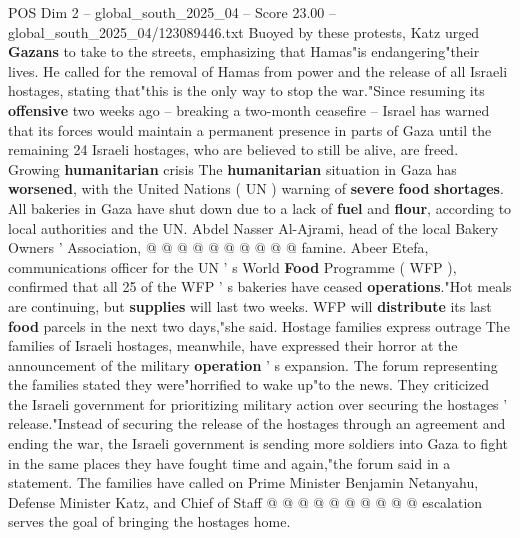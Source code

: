\begin{textsample}{POS Dim 2 – global\_south\_2025\_04 – Score 23.00 – global\_south\_2025\_04/123089446.txt}
Buoyed by these protests, Katz urged \textbf{Gazans} to take to the streets, emphasizing that Hamas"is endangering"their lives.
He called for the removal of Hamas from power and the release of all Israeli hostages, stating that"this is the only way to stop the war."Since resuming its \textbf{offensive} two weeks ago -- breaking a two-month ceasefire -- Israel has warned that its forces would maintain a permanent presence in parts of Gaza until the remaining 24 Israeli hostages, who are believed to still be alive, are freed.
Growing \textbf{humanitarian} crisis The \textbf{humanitarian} situation in Gaza has \textbf{worsened}, with the United Nations ( UN ) warning of \textbf{severe} \textbf{food} \textbf{shortages}.
All bakeries in Gaza have shut down due to a lack of \textbf{fuel} and \textbf{flour}, according to local authorities and the UN.
Abdel Nasser Al-Ajrami, head of the local Bakery Owners ' Association, @ @ @ @ @ @ @ @ @ @ famine.
Abeer Etefa, communications officer for the UN ' s World \textbf{Food} Programme ( WFP ), confirmed that all 25 of the WFP ' s bakeries have ceased \textbf{operations}."Hot meals are continuing, but \textbf{supplies} will last two weeks.
WFP will \textbf{distribute} its last \textbf{food} parcels in the next two days,"she said.
Hostage families express outrage The families of Israeli hostages, meanwhile, have expressed their horror at the announcement of the military \textbf{operation} ' s expansion.
The forum representing the families stated they were"horrified to wake up"to the news.
They criticized the Israeli government for prioritizing military action over securing the hostages ' release."Instead of securing the release of the hostages through an agreement and ending the war, the Israeli government is sending more soldiers into Gaza to fight in the same places they have fought time and again,"the forum said in a statement.
The families have called on Prime Minister Benjamin Netanyahu, Defense Minister Katz, and Chief of Staff @ @ @ @ @ @ @ @ @ @ escalation serves the goal of bringing the hostages home.

\end{textsample}
